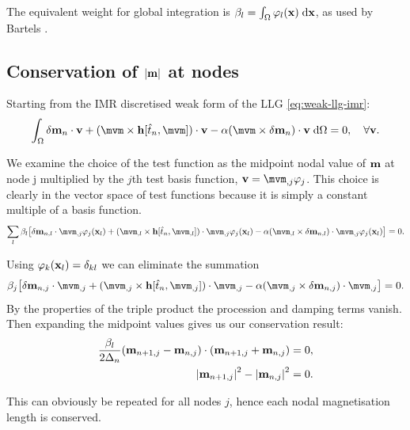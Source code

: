 The equivalent weight for global integration is $\beta_l = \int_{\Omega} \varphi_l(\mathbf{x}) {\; \text{d}} \mathbf{x}$, as used by Bartels \etal\cite{Bartels2006}.

\subsection{Conservation of $\left|{\mathbf{m}} \right|$ at nodes}
\label{sec:weak-cons-absmv}

Starting from the IMR discretised weak form of the LLG \eqref{eq:weak-llg-imr}:
\begin{equation}
  \intd{\dmdtm \cdot \testv + (\mvm \times \hv[\tm, \mvm]) \cdot \testv - \dampc (\mvm \times \dmdtm) \cdot \testv }= 0, \quad \forall \testv .
\end{equation}

\newcommand{\dmdtml}{\dtop \mv_{n,l}}
\newcommand{\dmdtmj}{\dtop \mv_{n,j}}

We examine the choice of the test function as the midpoint nodal value of $\mathbf{m}$ at node j multiplied by the $j$th test basis function, $\testv = \mvm_{,j} \tbf_j$.
This choice is clearly in the vector space of test functions because it is simply a constant multiple of a basis function.
\begin{equation}
  \sum_l \beta_l \bigs{\dmdtml \cdot \mvm_{,j}\tbf_j(\xv_l) + (\mvm_{,l} \times \hv[\tm, \mvm_{,l}]) \cdot \mvm_{,j}\tbf_j(\xv_l) - \dampc (\mvm_{,l} \times \dmdtml) \cdot \mvm_{,j}\tbf_j(\xv_l)} = 0.
\end{equation}

Using $\varphi_k(\mathbf{x}_l) = \delta_{kl}$ we can eliminate the summation
\begin{equation}
  \beta_j \bigs{\dmdtmj \cdot \mvm_{,j} + (\mvm_{,j} \times \hv[\tm, \mvm_{,j}]) \cdot \mvm_{,j} - \dampc (\mvm_{,j} \times \dmdtmj) \cdot \mvm_{,j}} = 0.
\end{equation}
By the properties of the triple product the procession and damping terms vanish. Then expanding the midpoint values gives us our conservation result:
\begin{equation}
  \begin{aligned}
    \frac{\beta_l}{2\Delta_{n}}(\mathbf{m}_{n+1,j} - \mathbf{m}_{n,j}) \cdot (\mathbf{m}_{n+1, j} + \mathbf{m}_{n, j}) &= 0, \\
    \left|{\mathbf{m}_{n+1, j}} \right|^2 - \left|{\mathbf{m}_{n, j}} \right|^2 &= 0.
  \end{aligned}
\end{equation}

This can obviously be repeated for all nodes $j$, hence each nodal magnetisation length is conserved.


